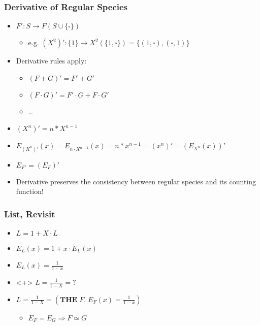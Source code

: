 \begin{frame}
\frametitle{Derivative of Regular Species}

\begin{itemize}
\item $F': S \rightarrow F(S\cup\{\square\}) $
\begin{itemize}
\item e.g. $(X^2)': \{1\} \rightarrow X^2(\{1, \square\}) = \{(1,\square), (\square, 1)\}$
\end{itemize}

\item \color{gray} Derivative rules apply:
\begin{itemize}
\color{gray} 
\item $(F+G)'=F'+G'$
\item $(F\cdot G)' = F'\cdot G + F \cdot G'$
\item \dots
\end{itemize}

\item $(X^n)' = n * X^{n-1}$
\item $E_{(X^n)'}(x) = E_{n\cdot X^{n-1}}(x) = n * x^{n-1} = (x^n)' = (E_{X^n}(x))'$
\item \color{black} $E_{F'} = (E_F)'$
\item Derivative preserves the consistency between regular species and its counting function!
\end{itemize}
\end{frame}

\begin{frame}
\frametitle{List, Revisit}

\begin{itemize}[<+->]
\item $L = 1 + X \cdot L$
\item $E_L(x) = 1 + x \cdot E_L(x)$
\item $E_L(x) = \frac{1}{1-x}$
\item 
\begin{onlyenv}<+>
$L = \frac{1}{1 - X} = ?$
\end{onlyenv}

\item 

$L = \frac{1}{1 - X} = (\textbf{THE}\; F.\; E_F(x) = \frac{1}{1-x})$


\begin{itemize}
\item $E_F = E_G \Longrightarrow F \simeq G$ 
\end{itemize}
\end{itemize}
\end{frame}
